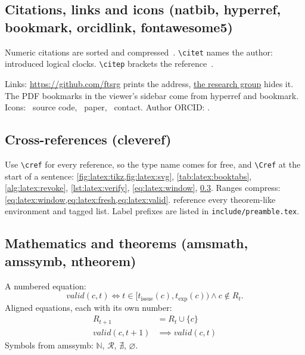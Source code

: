 \subsection{Citations, links and icons (natbib, hyperref, bookmark, orcidlink, fontawesome5)}\label{app:latex:cite}
Numeric citations are sorted and compressed~\cite{w3c2025vcdm,lamport1978time}.
\texttt{\textbackslash citet} names the author: \citet{lamport1978time} introduced logical clocks.
\texttt{\textbackslash citep} brackets the reference~\citep{lamport1978time}.

Links: \url{https://github.com/ftsrg} prints the address, \href{https://ftsrg.mit.bme.hu}{the research group} hides it.
The PDF bookmarks in the viewer's sidebar come from hyperref and bookmark.
Icons: \faGithub~source code, \faFilePdf~paper, \faEnvelope~contact. Author ORCID: .

\subsection{Cross-references (cleveref)}\label{app:latex:cref}
Use \texttt{\textbackslash cref} for every reference, so the type name comes for free, and \texttt{\textbackslash Cref} at the start of a sentence:
\cref{fig:latex:tikz,fig:latex:svg}, \cref{tab:latex:booktabs}, \cref{alg:latex:revoke}, \cref{lst:latex:verify}, \cref{eq:latex:window}, \cref{app:latex:theorems}.
Ranges compress: \cref{eq:latex:window,eq:latex:fresh,eq:latex:valid}.
 reference every theorem-like environment and tagged list.
Label prefixes are listed in \texttt{include/preamble.tex}.

\subsection{Mathematics and theorems (amsmath, amssymb, ntheorem)}\label{app:latex:theorems}
A numbered equation:
\begin{equation}\label{eq:latex:window}
  \mathit{valid}(c, t) \iff t \in [t_\mathrm{issue}(c), t_\mathrm{exp}(c)) \land c \notin R_t .
\end{equation}
Aligned equations, each with its own number:
\begin{align}
  R_{t+1} &= R_t \cup \{ c \} \label{eq:latex:fresh}\\
  \mathit{valid}(c, t+1) &\implies \mathit{valid}(c, t) \label{eq:latex:valid}
\end{align}
Symbols from amssymb: $\mathbb{N}$, $\mathcal{R}$, $\nexists$, $\varnothing$.

